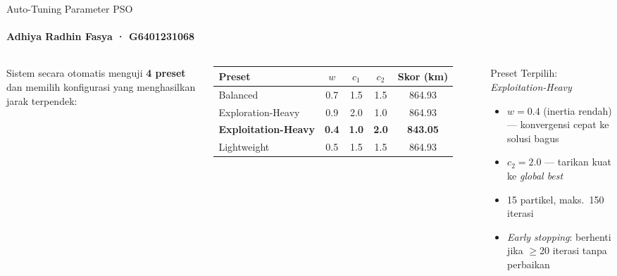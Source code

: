 \documentclass[aspectratio=169,10pt]{beamer}
\begin{document}
\begin{frame}{Auto-Tuning Parameter PSO}
  \framesubtitle{Adhiya Radhin Fasya · G6401231068}
  \begin{columns}[T,totalwidth=\textwidth]
    {\small Sistem secara otomatis menguji \textbf{4 preset} dan memilih
      konfigurasi yang menghasilkan jarak terpendek:}

    \vspace{0.18cm}
    \begin{tabular}{@{}lcccc@{}}
      \toprule
      \textbf{Preset} & $w$ & $c_1$ & $c_2$ & \textbf{Skor (km)} \\
      \midrule
      Balanced            & 0.7 & 1.5 & 1.5 & 864.93 \\
      Exploration-Heavy   & 0.9 & 2.0 & 1.0 & 864.93 \\
      \textbf{Exploitation-Heavy} & \textbf{0.4} & \textbf{1.0} & \textbf{2.0} & \textbf{843.05} \\
      Lightweight         & 0.5 & 1.5 & 1.5 & 864.93 \\
      \bottomrule
    \end{tabular}

    \vspace{0.2cm}
    \begin{block}{Preset Terpilih: \textit{Exploitation-Heavy}}
      \begin{itemize}\small
        \item $w=0.4$ (inertia rendah) --- konvergensi cepat ke solusi bagus
        \item $c_2=2.0$ --- tarikan kuat ke \textit{global best}
        \item 15 partikel, maks.\ 150 iterasi
        \item \textit{Early stopping}: berhenti jika $\geq$20 iterasi tanpa perbaikan
      \end{itemize}
    \end{block}


\end{columns}
\end{frame}
\end{document}
